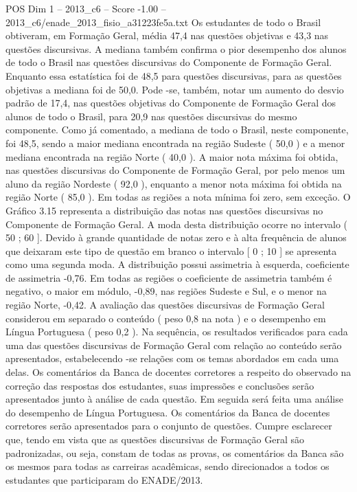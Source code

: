 \begin{textsample}{POS Dim 1 – 2013\_c6 – Score -1.00 – 2013\_c6/enade\_2013\_fisio\_a31223fe5a.txt}
Os estudantes de todo o Brasil obtiveram, em Formação Geral, média 47,4 nas questões objetivas e 43,3 nas questões discursivas.
A mediana também confirma o pior desempenho dos alunos de todo o Brasil nas questões discursivas do Componente de Formação Geral.
Enquanto essa estatística foi de 48,5 para questões discursivas, para as questões objetivas a mediana foi de 50,0.
Pode -se, também, notar um aumento do desvio padrão de 17,4, nas questões objetivas do Componente de Formação Geral dos alunos de todo o Brasil, para 20,9 nas questões discursivas do mesmo componente.
Como já comentado, a mediana de todo o Brasil, neste componente, foi 48,5, sendo a maior mediana encontrada na região Sudeste ( 50,0 ) e a menor mediana encontrada na região Norte ( 40,0 ).
A maior nota máxima foi obtida, nas questões discursivas do Componente de Formação Geral, por pelo menos um aluno da região Nordeste ( 92,0 ), enquanto a menor nota máxima foi obtida na região Norte ( 85,0 ).
Em todas as regiões a nota mínima foi zero, sem exceção.
O Gráfico 3.15 representa a distribuição das notas nas questões discursivas no Componente de Formação Geral.
A moda desta distribuição ocorre no intervalo ( 50 ; 60 ].
Devido à grande quantidade de notas zero e à alta frequência de alunos que deixaram este tipo de questão em branco o intervalo [ 0 ; 10 ] se apresenta como uma segunda moda.
A distribuição possui assimetria à esquerda, coeficiente de assimetria -0,76.
Em todas as regiões o coeficiente de assimetria também é negativo, o maior em módulo, -0,89, nas regiões Sudeste e Sul, e o menor na região Norte, -0,42.
A avaliação das questões discursivas de Formação Geral considerou em separado o conteúdo ( peso 0,8 na nota ) e o desempenho em Língua Portuguesa ( peso 0,2 ).
Na sequência, os resultados verificados para cada uma das questões discursivas de Formação Geral com relação ao conteúdo serão apresentados, estabelecendo -se relações com os temas abordados em cada uma delas.
Os comentários da Banca de docentes corretores a respeito do observado na correção das respostas dos estudantes, suas impressões e conclusões serão apresentados junto à análise de cada questão.
Em seguida será feita uma análise do desempenho de Língua Portuguesa.
Os comentários da Banca de docentes corretores serão apresentados para o conjunto de questões.
Cumpre esclarecer que, tendo em vista que as questões discursivas de Formação Geral são padronizadas, ou seja, constam de todas as provas, os comentários da Banca são os mesmos para todas as carreiras acadêmicas, sendo direcionados a todos os estudantes que participaram do ENADE/2013.

\end{textsample}
